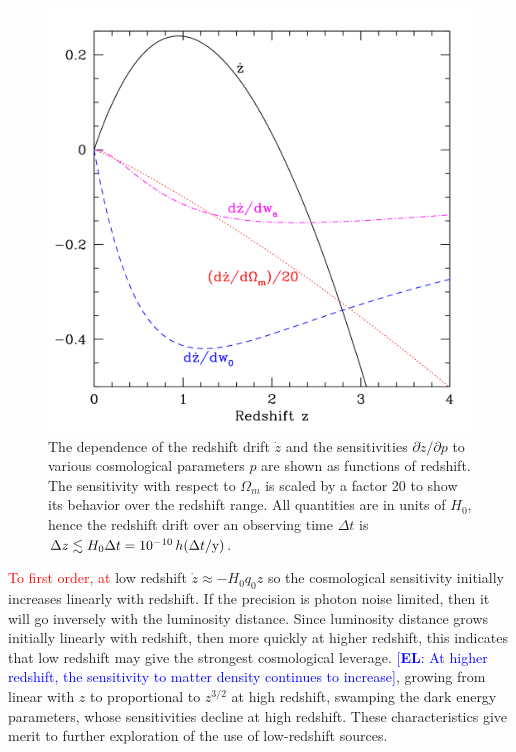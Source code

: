 \documentclass[preprint2, 10pt]{aastex}
\newcommand{\eric}[1]{\textcolor{blue}{[{\bf EL}: #1]}}
\newcommand{\om}{\Omega_m}
\begin{document}
\begin{figure}[!htbp] 
   \centering
   \includegraphics[width=\columnwidth]{zdriftd.pdf}
\caption{The dependence of the redshift drift $\dot z$ and the sensitivities 
$\partial\dot z/\partial p$ to various cosmological parameters $p$ are shown 
as functions of redshift. The sensitivity with respect to $\Omega_m$ is 
scaled by a factor 20 to show its behavior over the redshift range. All quantities are in units of $H_0$, hence 
the redshift drift over an observing time $\Delta t$ is 
$\Delta z\lesssim H_0\Delta t=10^{-10}\,h(\Delta t/{\rm y})$. 
}
\label{fig:sens} 
\end{figure}

\textcolor{red}
{To first order, at}
low redshift $\dot z\approx -H_0q_0z$ so the cosmological sensitivity 
initially increases linearly with redshift. If the precision is photon 
noise limited, then it will go inversely with the luminosity distance. 
Since luminosity distance grows initially linearly with redshift, then 
more quickly at higher redshift, this indicates that low redshift may give 
the strongest cosmological leverage. 
\eric{
At higher redshift, the sensitivity to matter density 
continues to increase}, growing from linear with $z$ to 
proportional to $z^{3/2}$ at high redshift, swamping the dark energy 
parameters, whose sensitivities decline at high redshift. These 
characteristics give merit to further exploration of the use of 
low-redshift sources. 
\end{document}
